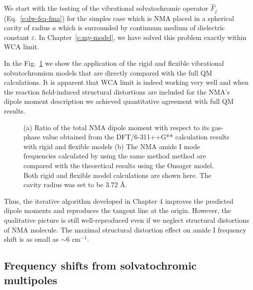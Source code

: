 \documentclass[a4paper,titlepage,twoside,fleqn,12pt]{book}
\begin{document}
\begin{refsection}
We start with the testing of the vibrational solvatochromic 
operator $\hat{F}_j$ (Eq.~\eqref{e:dw-fea-fma}) 
for the simples case which is NMA
placed in a spherical cavity of radius $a$ which is surrounded
by continuum medium of dielectric constant $\varepsilon$.
In Chapter~\ref{c:my-model}, we have solved this problem exactly within
WCA limit. 

In the Fig.~\ref{f:onsager} we show the application of the rigid
and flexible vibrational solvatochromism models that are directly
compared with the full QM calculations. It is apparent that WCA
limit is indeed working very well and when the reaction field\hyp{}induced 
structural distortions
are included for the NMA's dipole moment description 
we achieved quantitative agreement
with full QM results. 
%
\begin{figure}[t!]
\centering
\setlength\fboxsep{0.4pt}
\setlength\fboxrule{0.5pt}
\caption{
(a) Ratio of the total NMA dipole moment with respect to its gas\hyp{}phase
value obtained from the DFT/6-311++G** calculation results with rigid and flexible
models (b) The NMA amide I mode frequencies calculated by using the same method
method are compared with the theoretical results using the Onsager model. 
Both rigid and flexible model calculations are shown here. The cavity radius was set
to be 3.72 \AA.
\label{f:onsager}}
\end{figure}
%
Thus, the
iterative algorithm developed in Chapter 4 improves the predicted
dipole moments and reproduces the tangent line at the origin.
However, the qualitative
picture is still well\hyp{}reproduced even if we neglect
structural distortions of NMA molecule. The maximal structural
distortion effect on amide I frequency shift is as small
as $\sim$6 cm$^{-1}$.

\subsection{Frequency shifts from solvatochromic multipoles\label{s:amide-I-solvatochr-multipoles}}


\end{refsection}
\end{document}
